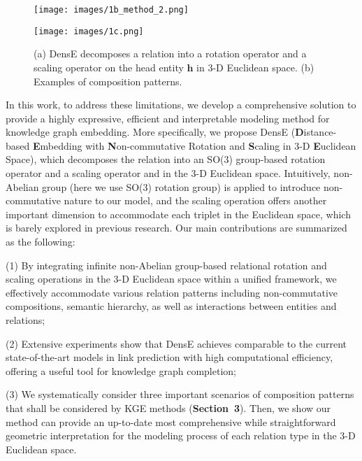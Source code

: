 \documentclass[11pt]{article}
\begin{document}
\begin{figure*}[!ht]
\centering     \begin{minipage}{9.0cm}
\centering
\texttt{[image: images/1b\_method\_2.png]}
\subcaption{}
\end{minipage}
\begin{minipage}{6.0cm}
\centering
\texttt{[image: images/1c.png]}
\subcaption{}
\end{minipage}
\caption{(a) DensE decomposes a relation into a rotation operator and a scaling operator on the head entity \(\boldsymbol{h}\) in 3-D Euclidean space. (b) Examples of composition patterns.}
\label{comparison diffpool and graphstar}
\end{figure*}

In this work, to address these limitations, we develop a comprehensive solution to provide a highly expressive, efficient and interpretable modeling method for knowledge graph embedding. More specifically, we propose DensE (\textbf{D}istance-based \textbf{E}mbedding with \textbf{N}on-commutative Rotation and \textbf{S}caling in 3-D \textbf{E}uclidean Space), which decomposes the relation into an SO(3) group-based rotation operator and a scaling operator and in the 3-D Euclidean space. Intuitively, non-Abelian group (here we use SO(3) rotation group) is applied to introduce non-commutative nature to our model, and the scaling operation offers another important dimension to accommodate each triplet in the Euclidean space, which is barely explored in previous research. Our main contributions are summarized as the following: 

(1) By integrating infinite non-Abelian group-based relational rotation and scaling operations in the 3-D Euclidean space within a unified framework, we effectively accommodate various relation patterns including non-commutative compositions, semantic hierarchy, as well as interactions between entities and relations;

(2) Extensive experiments show that DensE achieves comparable to the current state-of-the-art models in link prediction with high computational efficiency, offering a useful tool for knowledge graph completion;

(3) We systematically consider three important scenarios of composition patterns that shall be considered by KGE methods (\textbf{Section~3}). Then, we show our method can provide an up-to-date most comprehensive while straightforward geometric interpretation for the modeling process of each relation type in the 3-D Euclidean space.
\end{document}
